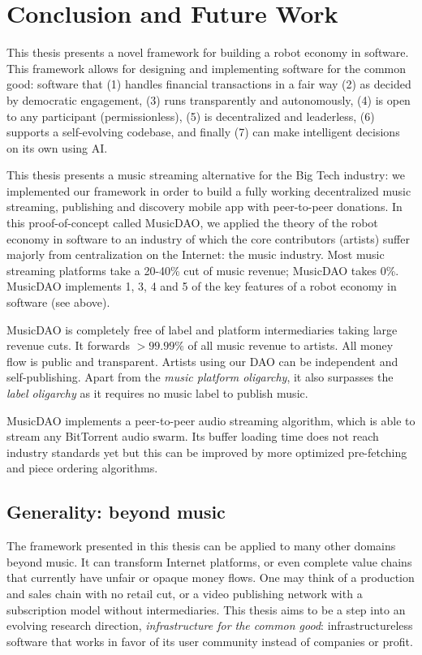 \chapter{Conclusion and Future Work}
This thesis presents a novel framework for building a robot economy in software. This framework allows for designing and implementing software for the common good: software that (1) handles financial transactions in a fair way (2) as decided by democratic engagement, (3) runs transparently and autonomously, (4) is open to any participant (permissionless), (5) is decentralized and leaderless, (6) supports a self-evolving codebase, and finally (7) can make intelligent decisions on its own using AI.

This thesis presents a music streaming alternative for the Big Tech industry: we implemented our framework in order to build a fully working decentralized music streaming, publishing and discovery mobile app with peer-to-peer donations. In this proof-of-concept called MusicDAO, we applied the theory of the robot economy in software to an industry of which the core contributors (artists) suffer majorly from centralization on the Internet: the music industry. Most music streaming platforms take a 20-40\% cut of music revenue; MusicDAO takes 0\%. MusicDAO implements 1, 3, 4 and 5 of the key features of a robot economy in software (see above).

MusicDAO is completely free of label and platform intermediaries taking large revenue cuts. It forwards $>99.99\%$ of all music revenue to artists. All money flow is public and transparent. Artists using our DAO can be independent and self-publishing. Apart from the \textit{music platform oligarchy}, it also surpasses the \textit{label oligarchy} as it requires no music label to publish music.

MusicDAO implements a peer-to-peer audio streaming algorithm, which is able to stream any BitTorrent audio swarm. Its buffer loading time does not reach industry standards yet but this can be improved by more optimized pre-fetching and piece ordering algorithms. 

\section{Generality: beyond music}
The framework presented in this thesis can be applied to many other domains beyond music. It can transform Internet platforms, or even complete value chains that currently have unfair or opaque money flows. One may think of a production and sales chain with no retail cut, or a video publishing network with a subscription model without intermediaries. This thesis aims to be a step into an evolving research direction, \textit{infrastructure for the common good}: infrastructureless software that works in favor of its user community instead of companies or profit.

